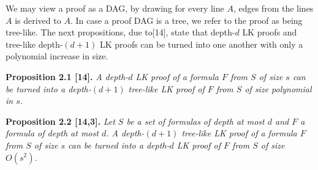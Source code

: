\documentclass[10pt,a4paper]{article}
\newenvironment{originalresult}[1]{\par\medskip\noindent\textbf{#1.}\itshape}{\par\medskip}
\begin{document}
We may view a proof as a DAG, by drawing for every line $A$, edges from the lines $A$ is derived to $A$. In case a proof DAG is a tree, we refer to the proof as being tree-like. The next propositions, due to[14], state that depth-$d$ LK proofs and tree-like depth-$(d+1)$ LK proofs can be turned into one another with only a polynomial increase in size.
\begin{originalresult}{Proposition 2.1 [14]}
A depth-$d$ LK proof of a formula $F$ from $S$ of size $s$ can be turned into a depth-$(d+1)$ tree-like LK proof of $F$ from $S$ of size polynomial in $s$.
\end{originalresult}
\begin{originalresult}{Proposition 2.2 [14,3]}
Let $S$ be a set of formulas of depth at most $d$ and $F$ a formula of depth at most $d$. A depth-$(d+1)$ tree-like LK proof of a formula $F$ from $S$ of size $s$ can be turned into a depth-$d$ LK proof of $F$ from $S$ of size $O(s^2)$.
\end{originalresult}
\end{document}
